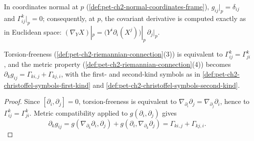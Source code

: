 \begin{remark}
  \label{rem:pet-ch2-christoffel-normal-coordinates}


  In coordinates normal at $p$ (\cref{def:pet-ch2-normal-coordinates-frame}),
  $g_{ij}|_p=\delta_{ij}$ and $\Gamma^k_{ij}|_p=0$; consequently, at $p$, the
  covariant derivative is computed exactly as in Euclidean space:
  $(\nabla_YX)|_p=\big(Y^i\partial_i(X^j)\big)|_p\,\partial_j|_p$.
\end{remark}

\begin{proposition}
  \label{prop:pet-ch2-christoffel-symmetry-metric-property}


  Torsion-freeness (\cref{def:pet-ch2-riemannian-connection}(3)) is equivalent
  to $\Gamma^k_{ij}=\Gamma^k_{ji}$, and the metric property
  (\cref{def:pet-ch2-riemannian-connection}(4)) becomes
  $\partial_kg_{ij}=\Gamma_{ki,j}+\Gamma_{kj,i}$, with the first- and
  second-kind symbols as in
  \cref{def:pet-ch2-christoffel-symbols-first-kind} and
  \cref{def:pet-ch2-christoffel-symbols-second-kind}.
\end{proposition}
\begin{proof}

  \sketch
  Since
  $[\partial_i,\partial_j]=0$, torsion-freeness is equivalent to
  $\nabla_{\partial_i}\partial_j=\nabla_{\partial_j}\partial_i$, hence to
  $\Gamma^k_{ij}=\Gamma^k_{ji}$. Metric compatibility applied to
  $g(\partial_i,\partial_j)$ gives
  \[
    \partial_k g_{ij}
      =g(\nabla_{\partial_k}\partial_i,\partial_j)
       +g(\partial_i,\nabla_{\partial_k}\partial_j)
      =\Gamma_{ki,j}+\Gamma_{kj,i}.
  \]
\end{proof}

